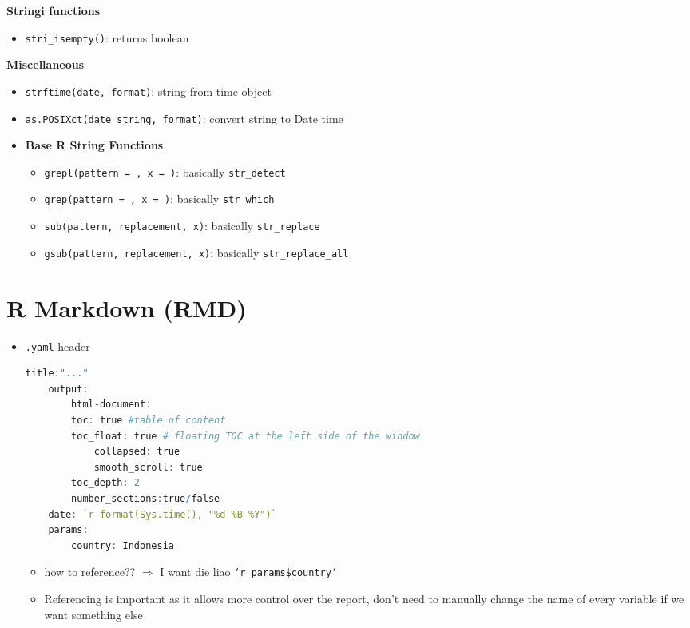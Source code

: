 \documentclass{article}
\begin{document}
\begin{multicols}{2}
\begin{itemize}
\end{itemize}
\textbf{Stringi functions}
\begin{itemize}
	\item \texttt{stri\_isempty()}: returns boolean
\end{itemize}
\textbf{Miscellaneous}
\begin{itemize}
	\item \texttt{strftime(date, format)}: string from time object
	\item \texttt{as.POSIXct(date\_string, format)}: convert string to Date time
	\item \textbf{Base R String Functions}
	\begin{itemize}
		\item \texttt{grepl(pattern = , x = )}: basically \texttt{str\_detect}
		\item \texttt{grep(pattern = , x = )}: basically \texttt{str\_which}
		\item \texttt{sub(pattern, replacement, x)}: basically \texttt{str\_replace}
		\item \texttt{gsub(pattern, replacement, x)}: basically \texttt{str\_replace\_all}
	\end{itemize}
\end{itemize}


\section{R Markdown (RMD)}
\begin{itemize}
	\item \texttt{.yaml} header
	\begin{lstlisting}[language=R]
	title:"..."
	output:
		html-document:
		toc: true #table of content
		toc_float: true # floating TOC at the left side of the window
			collapsed: true
			smooth_scroll: true
		toc_depth: 2
		number_sections:true/false
	date: `r format(Sys.time(), "%d %B %Y")`
	params:
		country: Indonesia
	\end{lstlisting}
\begin{itemize}
	\item how to reference?? $\Rightarrow$ I want die liao \texttt{`r params\$country`}
	\item Referencing is important as it allows more control over the report, don't need to manually change the name of every variable if we want something else
\end{itemize}


\end{itemize}
\end{multicols}
\end{document}
